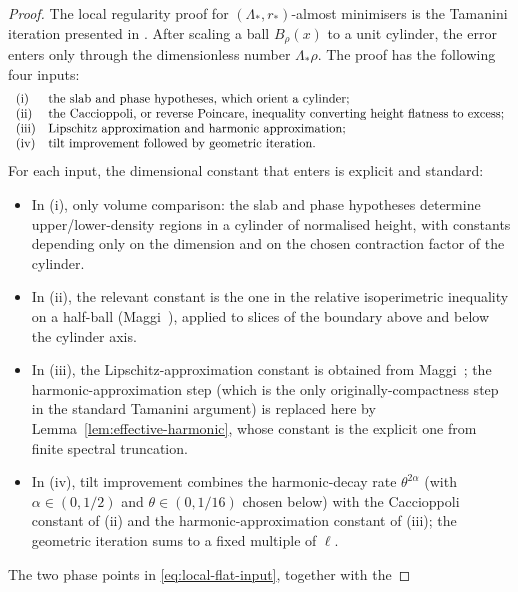 \documentclass[11pt]{amsart}
\theoremstyle{definition}
\begin{document}
\begin{proof}
The local regularity proof for \((\Lambda_*,r_*)\)-almost minimisers is
the Tamanini iteration presented in
\cite[Theorems 24.1, 24.2, 25.1, 25.3, and 26.3]{Maggi2012}.
After scaling a ball \(B_\rho(x)\) to a unit cylinder, the error enters
only through the dimensionless number \(\Lambda_*\rho\).  The proof has
the following four inputs:
\[
\begin{array}{ll}
\textnormal{(i)} & \text{the slab and phase hypotheses, which orient a
                       cylinder;}\\
\textnormal{(ii)}& \text{the Caccioppoli, or reverse Poincare, inequality
                       converting height flatness to excess;}\\
\textnormal{(iii)}&\text{Lipschitz approximation and harmonic
                       approximation;}\\
\textnormal{(iv)}& \text{tilt improvement followed by geometric iteration.}
\end{array}
\]
For each input, the dimensional constant that enters is explicit and standard:
\begin{itemize}[leftmargin=2em,itemsep=2pt]
\item In (i), only volume comparison: the slab and phase hypotheses determine
upper/lower-density regions in a cylinder of normalised height, with
constants depending only on the dimension and on the chosen contraction
factor of the cylinder.
\item In (ii), the relevant constant is the one in the relative
isoperimetric inequality on a half-ball (Maggi~\cite[Thm.~12.17]{Maggi2012}),
applied to slices of the boundary above and below the cylinder axis.
\item In (iii), the Lipschitz-approximation constant is obtained from
Maggi~\cite[Thm.~23.7]{Maggi2012}; the harmonic-approximation step (which is
the only originally-compactness step in the standard Tamanini argument)
is replaced here by Lemma~\ref{lem:effective-harmonic}, whose constant is
the explicit one from finite spectral truncation.
\item In (iv), tilt improvement combines the harmonic-decay rate
\(\theta^{2\alpha}\) (with \(\alpha\in(0,1/2)\) and \(\theta\in(0,1/16)\) chosen
below) with the Caccioppoli constant of (ii) and the
harmonic-approximation constant of (iii); the geometric iteration sums
to a fixed multiple of \(\ell\).
\end{itemize}
The two phase points in \eqref{eq:local-flat-input}, together with the

\end{proof}
\end{document}
